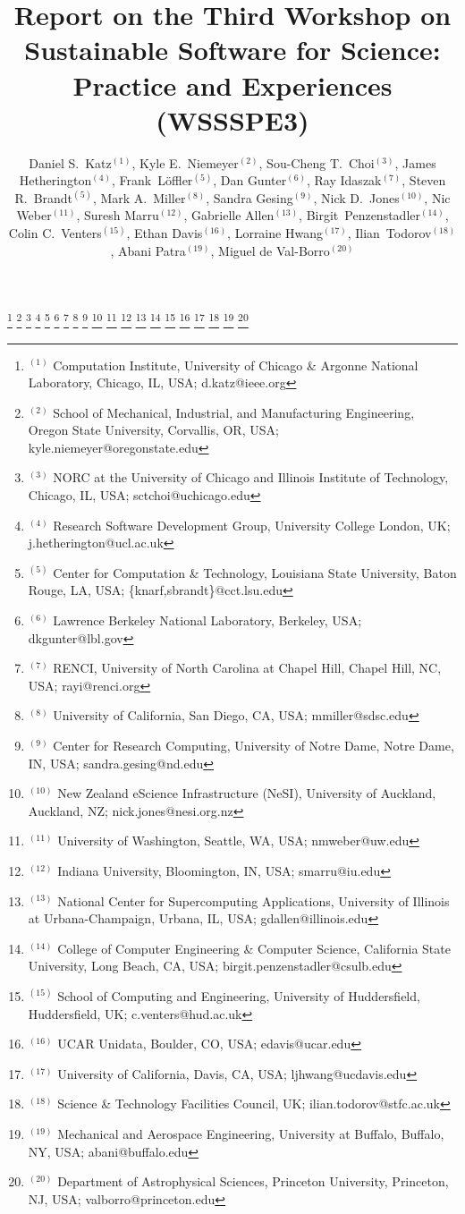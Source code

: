 \documentclass[11pt, oneside]{amsart}
\begin{document}
\title[]{Report on the Third Workshop on Sustainable Software for Science: Practice and Experiences (WSSSPE3)}

\author{Daniel S.\ Katz$^{(1)}$,
Kyle E.\ Niemeyer$^{(2)}$,
Sou-Cheng T.\ Choi$^{(3)}$,
James Hetherington$^{(4)}$,
Frank~L\"{o}ffler$^{(5)}$,
Dan Gunter$^{(6)}$,
Ray Idaszak$^{(7)}$,
Steven R.\ Brandt$^{(5)}$,
Mark A.\ Miller$^{(8)}$,
Sandra Gesing$^{(9)}$,
Nick D.\ Jones$^{(10)}$,
Nic Weber$^{(11)}$,
Suresh Marru$^{(12)}$,
Gabrielle Allen$^{(13)}$,
Birgit~Penzenstadler$^{(14)}$,
Colin C.\ Venters$^{(15)}$,
Ethan Davis$^{(16)}$,
Lorraine Hwang$^{(17)}$,
Ilian~Todorov$^{(18)}$,
Abani Patra$^{(19)}$,
Miguel de Val-Borro$^{(20)}$
}


%
\thanks{{}$^{(1)}$ \hspace{-1ex}Computation Institute, 
University of Chicago \& Argonne National Laboratory, Chicago, IL, USA; d.katz@ieee.org}
%
\thanks{{}$^{(2)}$ School of Mechanical, Industrial, and Manufacturing Engineering, 
Oregon State University, Corvallis, OR, USA; kyle.niemeyer@oregonstate.edu}
%
\thanks{{}$^{(3)}$ NORC at the University of Chicago and Illinois Institute of Technology, Chicago, IL, USA; sctchoi@uchicago.edu}
%
\thanks{{}$^{(4)}$ Research Software Development Group, University College London, UK; j.hetherington@ucl.ac.uk}
%
\thanks{{}$^{(5)}$ \hspace{-1.5ex}Center for Computation \& Technology, Louisiana State University, Baton Rouge, LA, USA; \{knarf,sbrandt\}@cct.lsu.edu}
%
\thanks{{}$^{(6)}$ Lawrence Berkeley National Laboratory, Berkeley, USA; dkgunter@lbl.gov}
%
\thanks{{}$^{(7)}$ RENCI, University of North Carolina at Chapel Hill, Chapel Hill, NC, USA; rayi@renci.org}
%
\thanks{{}$^{(8)}$ University of California, San Diego, CA, USA; mmiller@sdsc.edu}
%
\thanks{{}$^{(9)}$ Center for Research Computing, University of Notre Dame, Notre Dame, IN, USA; sandra.gesing@nd.edu}
%
\thanks{{}$^{(10)}$ New Zealand eScience Infrastructure (NeSI), University of Auckland, Auckland, NZ; nick.jones@nesi.org.nz}
%
\thanks{{}$^{(11)}$ University of Washington, Seattle, WA, USA; nmweber@uw.edu}
%
\thanks{{}$^{(12)}$ Indiana University, Bloomington, IN, USA; smarru@iu.edu}
%
\thanks{{}$^{(13)}$ National Center for Supercomputing Applications, University of Illinois at Urbana-Champaign, Urbana, IL, USA; gdallen@illinois.edu}
%
\thanks{{}$^{(14)}$ College of Computer Engineering \& Computer Science, California State University, Long Beach, CA, USA; birgit.penzenstadler@csulb.edu}
%
\thanks{{}$^{(15)}$ School of Computing and Engineering, University of Huddersfield, Huddersfield, UK; c.venters@hud.ac.uk}
%
\thanks{{}$^{(16)}$ UCAR Unidata, Boulder, CO, USA; edavis@ucar.edu}
%
\thanks{{}$^{(17)}$  University of California, Davis, CA, USA; ljhwang@ucdavis.edu}
%
\thanks{{}$^{(18)}$ Science \& Technology Facilities Council, UK; ilian.todorov@stfc.ac.uk}
%
\thanks{{}$^{(19)}$ Mechanical and Aerospace Engineering, University at Buffalo, Buffalo, NY, USA; abani@buffalo.edu}
%
\thanks{{}$^{(20)}$ Department of Astrophysical Sciences, Princeton University, Princeton, NJ, USA; valborro@princeton.edu}
%
 
\end{document}
